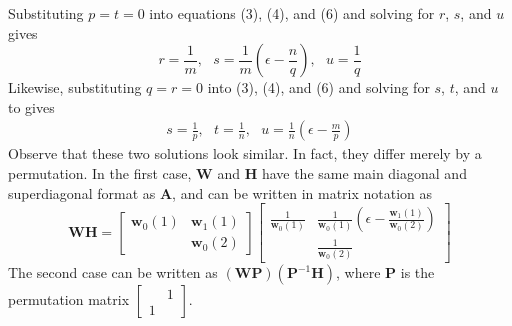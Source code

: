 \documentclass[conference]{IEEEtran}
\begin{document}
Substituting $ p = t = 0 $ into equations (3), (4), and (6) and solving for $ r $, $ s $, and $ u $ gives
\begin{equation}
r = \frac{1}{m}, ~~~
s = \frac{1}{m}\left( \epsilon - \frac{n}{q} \right), ~~~
u = \frac{1}{q}
\end{equation}
Likewise, substituting $ q = r = 0 $ into (3), (4), and (6) and solving for $ s $, $ t $, and $ u $ to gives
\begin{align}
s = \frac{1}{p}, ~~~
t = \frac{1}{n}, ~~~
u = \frac{1}{n} \left( \epsilon - \frac{m}{p} \right)
\end{align}
Observe that these two solutions look similar.  In fact, they differ merely by a permutation.  In the first case,  $ \mathbf{W} $ and $ \mathbf{H} $ have the same main diagonal and superdiagonal format as $ \mathbf{A} $, and can be written in matrix notation as
\begin{equation}
\mathbf{WH} = \left[ \begin{array}{cc} \mathbf{w}_0(1) & \mathbf{w}_1(1) \\ & \mathbf{w}_0(2) \end{array} \right] \left[ \begin{array}{cc} \frac{1}{\mathbf{w}_0(1)} & \frac{1}{\mathbf{w}_0(1)}(\epsilon - \frac{\mathbf{w}_1(1)}{\mathbf{w}_0(2)}) \\ & \frac{1}{\mathbf{w}_0(2)} \end{array} \right]
\end{equation}
The second case can be written as $ (\mathbf{WP})(\mathbf{P}^{-1}\mathbf{H}) $, where $ \mathbf{P} $ is the permutation matrix $ \left[ \begin{array}{cc} & 1 \\ 1 & \end{array} \right] $.
\end{document}
